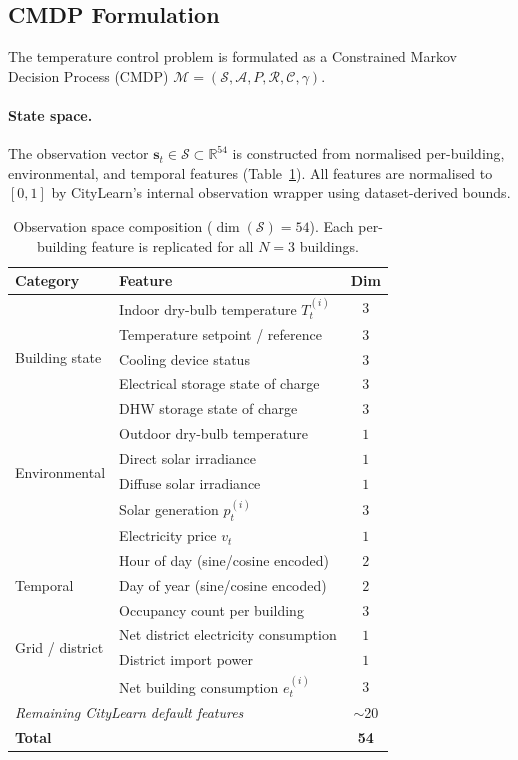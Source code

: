 \subsection{CMDP Formulation}
\label{sec:temp-formulation}

The temperature control problem is formulated as a Constrained Markov Decision
Process (CMDP) $\mathcal{M} = (\mathcal{S}, \mathcal{A}, P, \mathcal{R},
\mathcal{C}, \gamma)$.

\paragraph{State space.}
The observation vector $\mathbf{s}_t \in \mathcal{S} \subset \mathbb{R}^{54}$
is constructed from normalised per-building, environmental, and temporal
features (Table~\ref{tab:observation-space}).  All features are normalised to
$[0, 1]$ by CityLearn's internal observation wrapper using dataset-derived
bounds.

\begin{table}[htbp]
\centering
\caption{Observation space composition ($\dim(\mathcal{S}) = 54$).  Each
  per-building feature is replicated for all $N=3$ buildings.}
\label{tab:observation-space}
\begin{tabular}{llc}
\toprule
\textbf{Category} & \textbf{Feature} & \textbf{Dim} \\
\midrule
\multirow{5}{*}{Building state}
  & Indoor dry-bulb temperature $T_t^{(i)}$ & $3$ \\
  & Temperature setpoint / reference & $3$ \\
  & Cooling device status & $3$ \\
  & Electrical storage state of charge & $3$ \\
  & DHW storage state of charge & $3$ \\
\midrule
\multirow{4}{*}{Environmental}
  & Outdoor dry-bulb temperature & $1$ \\
  & Direct solar irradiance & $1$ \\
  & Diffuse solar irradiance & $1$ \\
  & Solar generation $p_t^{(i)}$ & $3$ \\
  & Electricity price $v_t$ & $1$ \\
\midrule
\multirow{3}{*}{Temporal}
  & Hour of day (sine/cosine encoded) & $2$ \\
  & Day of year (sine/cosine encoded) & $2$ \\
  & Occupancy count per building & $3$ \\
\midrule
\multirow{2}{*}{Grid / district}
  & Net district electricity consumption & $1$ \\
  & District import power & $1$ \\
  & Net building consumption $e_t^{(i)}$ & $3$ \\
\midrule
\multicolumn{2}{l}{\textit{Remaining CityLearn default features}} & $\sim$20 \\
\bottomrule
\multicolumn{2}{l}{\textbf{Total}} & \textbf{54} \\
\end{tabular}
\end{table}

